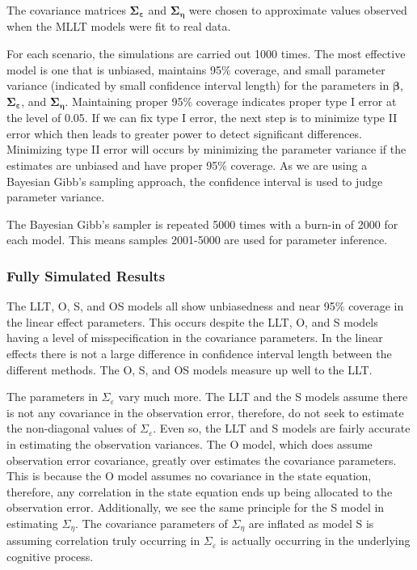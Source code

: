 \documentclass[
]{article}
\begin{document}
The covariance matrices \(\boldsymbol{\Sigma_\varepsilon}\) and \(\boldsymbol{\Sigma_\eta}\) were chosen to approximate values observed when the MLLT models were fit to real data.

For each scenario, the simulations are carried out 1000 times. The most effective model is one that is unbiased, maintains 95\% coverage, and small parameter variance (indicated by small confidence interval length) for the parameters in \(\boldsymbol{\beta}\), \(\boldsymbol{\Sigma_\varepsilon}\), and \(\boldsymbol{\Sigma_\eta}\). Maintaining proper 95\% coverage indicates proper type I error at the level of 0.05. If we can fix type I error, the next step is to minimize type II error which then leads to greater power to detect significant differences. Minimizing type II error will occurs by minimizing the parameter variance if the estimates are unbiased and have proper 95\% coverage. As we are using a Bayesian Gibb's sampling approach, the confidence interval is used to judge parameter variance.

The Bayesian Gibb's sampler is repeated 5000 times with a burn-in of 2000 for each model. This means samples 2001-5000 are used for parameter inference.

\hypertarget{fully-simulated-results}{%
\subsubsection{Fully Simulated Results}\label{fully-simulated-results}}

The LLT, O, S, and OS models all show unbiasedness and near 95\% coverage in the linear effect parameters. This occurs despite the LLT, O, and S models having a level of misspecification in the covariance parameters. In the linear effects there is not a large difference in confidence interval length between the different methods. The O, S, and OS models measure up well to the LLT.

The parameters in \(\Sigma_\varepsilon\) vary much more. The LLT and the S models assume there is not any covariance in the observation error, therefore, do not seek to estimate the non-diagonal values of \(\Sigma_\varepsilon\). Even so, the LLT and S models are fairly accurate in estimating the observation variances. The O model, which does assume observation error covariance, greatly over estimates the covariance parameters. This is because the O model assumes no covariance in the state equation, therefore, any correlation in the state equation ends up being allocated to the observation error. Additionally, we see the same principle for the S model in estimating \(\Sigma_\eta\). The covariance parameters of \(\Sigma_\eta\) are inflated as model S is assuming correlation truly occurring in \(\Sigma_\varepsilon\) is actually occurring in the underlying cognitive process.
\end{document}
